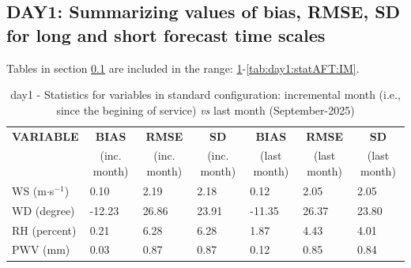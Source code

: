 \subsection{DAY1: Summarizing values of bias, RMSE, SD for long and short forecast time scales}\label{subsec:day1:stat}
Tables in section \ref{subsec:day1:stat} are included in the range: \ref{tab:day1:statBEF}-\ref{tab:day1:statAFT:IM}.
\begin{table}[h!]
\begin{center}
\begin{tabular}{|l|l|l|l|l|l|l|}
\hline
\multicolumn{1}{|c|}{\cellcolor[HTML]{C0C0C0}\textbf{VARIABLE}} & \multicolumn{1}{c|}{\cellcolor[HTML]{C0C0C0}\textbf{BIAS}} & \multicolumn{1}{c|}{\cellcolor[HTML]{C0C0C0}\textbf{RMSE}} & \multicolumn{1}{c|}{\cellcolor[HTML]{C0C0C0}\textbf{SD}} & \multicolumn{1}{c|}{\cellcolor[HTML]{C0C0C0}\textbf{BIAS}} & \multicolumn{1}{c|}{\cellcolor[HTML]{C0C0C0}\textbf{RMSE}} & \multicolumn{1}{c|}{\cellcolor[HTML]{C0C0C0}\textbf{SD}}\\
\multicolumn{1}{|c|}{\cellcolor[HTML]{C0C0C0}} & \multicolumn{1}{c|}{\cellcolor[HTML]{C0C0C0}(inc. month)} & \multicolumn{1}{c|}{\cellcolor[HTML]{C0C0C0}(inc. month)} & \multicolumn{1}{c|}{\cellcolor[HTML]{C0C0C0}(inc. month)} & \multicolumn{1}{c|}{\cellcolor[HTML]{C0C0C0}(last month)} & \multicolumn{1}{c|}{\cellcolor[HTML]{C0C0C0}(last month)} & \multicolumn{1}{c|}{\cellcolor[HTML]{C0C0C0}(last month)}\\\hline
\cellcolor[HTML]{C0C0C0}WS (m$\cdot$s$^{-1}$) &      0.10  &      2.19  &      2.18  &      0.12     &      2.05     &      2.05\\
\cellcolor[HTML]{C0C0C0}WD (degree)           &    -12.23  &     26.86  &     23.91  &    -11.35     &     26.37     &     23.80\\
\cellcolor[HTML]{C0C0C0}RH (percent)          &      0.21  &      6.28  &      6.28  &      1.87     &      4.43     &      4.01\\
\cellcolor[HTML]{C0C0C0}PWV (mm)              &      0.03 &      0.87 &      0.87 &      0.12    &      0.85    &      0.84\\
\hline
\end{tabular}
\caption{day1 - Statistics for variables in standard configuration: incremental month (i.e., since the begining of service) \textit{vs} last month (September-2025)}\label{tab:day1:statBEF}
\end{center}
\end{table}

